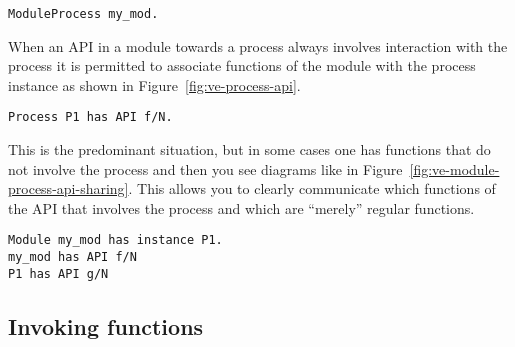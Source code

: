 \documentclass[a4paper, pdftex]{tufte-handout}
\begin{document}
\begin{marginfigure}
  \centering
  \caption{\texttt{ModuleProcess my\_mod.}}
  \label{fig:ve-module-process-instance-shorthand2}
\end{marginfigure}

When an API in a module towards a process always involves interaction with the
process it is permitted to associate functions of the module with the process
instance as shown in Figure~\ref{fig:ve-process-api}.

\begin{marginfigure}
  \centering
  \caption{\texttt{Process P1 has API f/N.}}
  \label{fig:ve-process-api}
\end{marginfigure}

This is the predominant situation, but in some cases one has functions that do not
involve the process and then you see diagrams like in
Figure~\ref{fig:ve-module-process-api-sharing}. This allows you to clearly
communicate which functions of the API that involves the process and which are
``merely'' regular functions.

\begin{marginfigure}
  \centering
  \caption{\texttt{Module my\_mod has instance P1.}\\
    \texttt{my\_mod has API f/N}\\
    \texttt{P1 has API g/N}
  }
  \label{fig:ve-module-process-api-sharing}
\end{marginfigure}

\subsection{Invoking functions}
\label{sec:invoking-functions}
\end{document}
